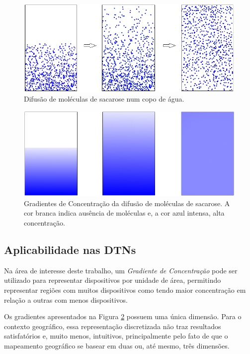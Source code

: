 \begin{figure}[htp!]
\centering
\includegraphics[width=1.0\textwidth]{figuras/cap_2/secao_2/modeculas_sacarose_agua.png}
\caption{Difusão de moléculas de sacarose num copo de água.}
\label{modeculas_sacarose_agua}
\end{figure}

\begin{figure}[htp!]
\centering
\includegraphics[width=1.0\textwidth]{figuras/cap_2/secao_2/gradiente_modeculas_sacarose_agua.png}
\caption{Gradientes de Concentração da difusão de moléculas de sacarose. A cor branca indica ausência de moléculas e, a cor azul intensa, alta concentração.}
\label{gradiente_modeculas_sacarose_agua}
\end{figure}
\newpage
\subsection{Aplicabilidade nas DTNs}

Na área de interesse deste trabalho, um \emph{Gradiente de Concentração} pode ser utilizado para representar dispositivos por unidade de área, permitindo representar regiões com muitos dispositivos como tendo maior concentração em relação a outras com menos dispositivos.

Os gradientes apresentados na Figura \ref{gradiente_modeculas_sacarose_agua} possuem uma única dimensão. Para o contexto geográfico, essa representação discretizada não traz resultados satisfatórios e, muito menos, intuitivos, principalmente pelo fato de que o mapeamento geográfico se basear em duas ou, até mesmo, três dimensões.


